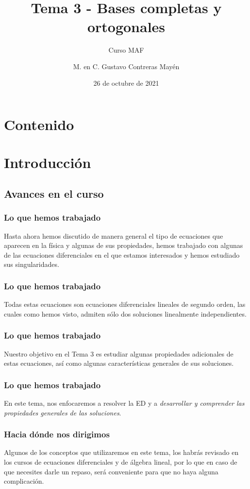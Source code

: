 \documentclass[12pt]{beamer}
\date{26 de octubre de 2021}
\title{\large{Tema 3 - Bases completas y ortogonales}}
\subtitle{Curso MAF}
\author{M. en C. Gustavo Contreras Mayén}
\begin{document}
\maketitle
\fontsize{14}{14}\selectfont
{}

\section*{Contenido}

\section{Introducción}
\subsection{Avances en el curso}

\begin{frame}
\frametitle{Lo que hemos trabajado}
Hasta ahora hemos discutido de manera general el tipo de ecuaciones que aparecen en la física y algunas de sus propiedades, hemos trabajado con algunas de las ecuaciones diferenciales en el que estamos interesados y hemos estudiado sus singularidades.
\end{frame}
\begin{frame}
\frametitle{Lo que hemos trabajado}
Todas estas ecuaciones son ecuaciones diferenciales lineales de segundo orden, las cuales como hemos visto, admiten sólo dos soluciones linealmente independientes.
\end{frame}
\begin{frame}
\frametitle{Lo que hemos trabajado}
Nuestro objetivo en el Tema 3 es estudiar algunas propiedades adicionales de estas ecuaciones, así como algunas características generales de sus soluciones. 
\end{frame}
\begin{frame}
\frametitle{Lo que hemos trabajado}
En este tema, nos enfocaremos a resolver la ED y a \emph{desarrollar y comprender las propiedades generales de las soluciones}.
\end{frame}
\begin{frame}
\frametitle{Hacia dónde nos dirigimos}
Algunos de los conceptos que utilizaremos en este tema, los habrás revisado en los cursos de ecuaciones diferenciales y de álgebra lineal, por lo que en caso de que necesites darle un repaso, será conveniente para que no haya alguna complicación.
\end{frame}
\end{document}
